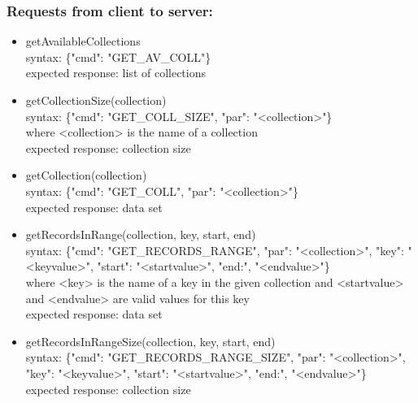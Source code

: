\documentclass[oneside, english, final]{design}
\begin{document}
\subsubsection{Requests from client to server:}
\begin{itemize}
\item{getAvailableCollections}
\\
syntax: \{"cmd": "GET\_AV\_COLL"\} \\
expected response: list of collections

\item{getCollectionSize(collection)}
\\
syntax: \{"cmd": "GET\_COLL\_SIZE", "par": "<collection>"\} \\
where <collection> is the name of a collection\\
expected response: collection size
       
\item{getCollection(collection)}
\\
syntax: \{"cmd": "GET\_COLL", "par": "<collection>"\} \\
expected response: data set

\item{getRecordsInRange(collection, key, start, end)}
\\
syntax: \{"cmd": "GET\_RECORDS\_RANGE", "par": "<collection>", "key": "<keyvalue>", "start": "<startvalue>", "end:", "<endvalue>"\} \\
where <key> is the name of a key in the given collection and <startvalue> and <endvalue> are valid values for this key\\
expected response: data set

\item{getRecordsInRangeSize(collection, key, start, end)}
\\
syntax: \{"cmd": "GET\_RECORDS\_RANGE\_SIZE", "par": "<collection>", "key": "<keyvalue>", "start": "<startvalue>", "end:", "<endvalue>"\} \\
expected response: collection size

\end{itemize}
\end{document}
